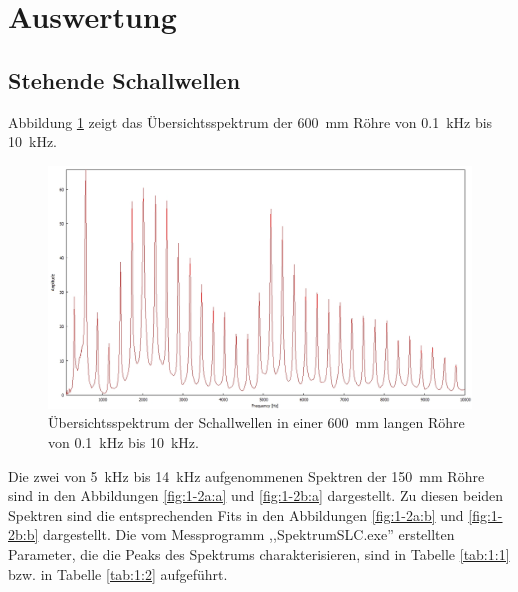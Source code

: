 \section{Auswertung}
\label{sec:Auswertung}
\subsection{Stehende Schallwellen}
\label{subsec:Stehende Schallwellen}
Abbildung \ref{fig:1-1} zeigt das Übersichtsspektrum der 600~mm Röhre von 0.1~kHz bis 10~kHz.
\begin{figure}
\centering
\includegraphics[width=\textwidth]{content/messungen/Chapter1/1-1img.jpg}
\caption{Übersichtsspektrum der Schallwellen in einer 600~mm langen Röhre von 0.1~kHz bis 10~kHz.}
\label{fig:1-1}
\end{figure}
Die zwei von 5~kHz bis 14~kHz aufgenommenen Spektren der 150~mm Röhre sind in den Abbildungen \ref{fig:1-2a:a} und \ref{fig:1-2b:a} dargestellt.
Zu diesen beiden Spektren sind die entsprechenden Fits in den Abbildungen \ref{fig:1-2a:b} und \ref{fig:1-2b:b} dargestellt.
Die vom Messprogramm ,,SpektrumSLC.exe'' erstellten Parameter, die die Peaks des Spektrums charakterisieren, sind in Tabelle \ref{tab:1:1} bzw. in Tabelle \ref{tab:1:2} aufgeführt.
